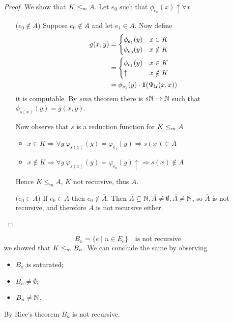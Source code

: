 \begin{proof}
  We show that $K \leq_m A$. 
  Let $ e_0$ such that $\phi_{e_0}(x)\uparrow\forall x$
  \begin{itemize}
  \item[($e_0 \notin A$)]
     Suppose
    $e_0\notin A$ and let $e_1\in A$.
    Now define
    \begin{align*}
      g(x,y) &= \begin{cases}
        \phi_{e_1}(y) & x \in K \\
        \phi_{e_0}(y) & x \notin K
      \end{cases} \\
      &=
      \begin{cases}
        \phi_{e_1}(y) & x \in K \\
        \uparrow & x \notin K
      \end{cases} \\
      &= \phi_{e_1}(y) \cdot \mathbf{1}(\Psi_{\mathcal{U}}(x,x))
    \end{align*}
    it is computable. By \emph{smn} theorem there is $s \mathbb{N} \to \mathbb{N}$ such that
    $ \phi_{s(x)}(y) = g(x,y)$.

    Now observe that $s$ is a reduction function for $K \leq_m A$
    \begin{itemize}
      \item $x \in K
      \Rightarrow \forall y  \ \varphi_{s(x)}(y) = \varphi_{e_1}(y)
      \Rightarrow s(x) \in A$
      \item $x \notin K
      \Rightarrow \forall y  \ \varphi_{s(x)}(y) = \varphi_{e_0}(y)\uparrow 
      \Rightarrow s(x) \notin A$
    \end{itemize}
    Hence $K \leq_m A$, $K$ not recursive, thus $A$.
    
  \item[($e_0 \in A$)] If $e_0 \in A$ then $ e_0 \not \in \bar{A}
    $. Then
    $ \bar{A} \subseteq \mathbb{N}, \bar{A} \neq \emptyset, \bar{A} \neq
    \mathbb{N} $, so $\bar{A}$ is not recursive, and
    therefore $A$ is not recursive either.
  \end{itemize}
\end{proof}

\begin{example}
  \[ B_n = \{e \mid n \in E_e \} \quad \mbox{is not recursive} \]
  we showed that $K \leq_m B_n$. We can conclude the same by observing
  \begin{itemize}
  \item $B_n$ is saturated;
  \item $B_n \neq \emptyset$;
  \item $B_n \neq \mathbb{N}$.
  \end{itemize}
  By Rice's theorem $ B_n $ is not recursive.
\end{example}

